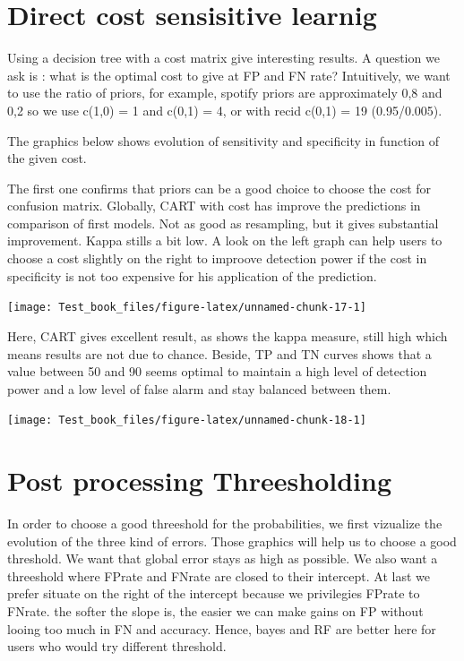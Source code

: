 \documentclass[
]{report}
\begin{document}
\hypertarget{direct-cost-sensisitive-learnig}{%
\section{Direct cost sensisitive learnig}\label{direct-cost-sensisitive-learnig}}

Using a decision tree with a cost matrix give interesting results.
A question we ask is : what is the optimal cost to give at FP and FN rate?
Intuitively, we want to use the ratio of priors, for example, spotify priors are approximately 0,8 and 0,2 so we use c(1,0) = 1 and c(0,1) = 4, or with recid c(0,1) = 19 (0.95/0.005).

The graphics below shows evolution of sensitivity and specificity in function of the given cost.

The first one confirms that priors can be a good choice to choose the cost for confusion matrix. Globally, CART with cost has improve the predictions in comparison of first models. Not as good as resampling, but it gives substantial improvement. Kappa stills a bit low. A look on the left graph can help users to choose a cost slightly on the right to improove detection power if the cost in specificity is not too expensive for his application of the prediction.

\begin{center}\texttt{[image: Test\_book\_files/figure-latex/unnamed-chunk-17-1]} \end{center}

Here, CART gives excellent result, as shows the kappa measure, still high which means results are not due to chance. Beside, TP and TN curves shows that a value between 50 and 90 seems optimal to maintain a high level of detection power and a low level of false alarm and stay balanced between them.

\begin{center}\texttt{[image: Test\_book\_files/figure-latex/unnamed-chunk-18-1]} \end{center}

\hypertarget{post-processing-threesholding-1}{%
\section{Post processing Threesholding}\label{post-processing-threesholding-1}}

In order to choose a good threeshold for the probabilities, we first vizualize the evolution of the three kind of errors. Those graphics will help us to choose a good threshold. We want that global error stays as high as possible. We also want a threeshold where FPrate and FNrate are closed to their intercept. At last we prefer situate on the right of the intercept because we privilegies FPrate to FNrate. the softer the slope is, the easier we can make gains on FP without looing too much in FN and accuracy. Hence, bayes and RF are better here for users who would try different threshold.
\end{document}
